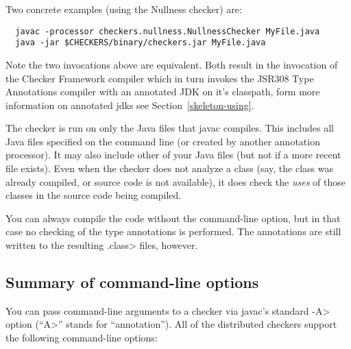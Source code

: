 Two concrete examples (using the Nullness checker) are:

\begin{smaller}
\begin{Verbatim}
  javac -processor checkers.nullness.NullnessChecker MyFile.java
  java -jar $CHECKERS/binary/checkers.jar MyFile.java
\end{Verbatim}
\end{smaller}

\noindent
Note the two invocations above are equivalent.  Both result in the invocation of the
Checker Framework compiler which in turn invokes the JSR308 Type Annotations compiler
with an annotated JDK on it's classpath, form more information on annotated jdks see
Section~\ref{skeleton-using}.

The checker is run on only the Java files that javac compiles.
This includes all Java files specified on the command line (or
created by another annotation processor).  It may also include other of
your Java files (but not if a more recent  file exists).
Even when the checker does not analyze a class (say, the class was
already compiled, or source code is not available), it does check
the \emph{uses} of those classes in the source code being compiled.

You can always compile the code without the 
command-line option, but in that case no checking of the type
annotations is performed.  The annotations are still written to the
resulting \<.class> files, however.



\subsection{Summary of command-line options\label{checker-options}}

You can pass command-line arguments to a checker via javac's standard \<-A>
option (``\<A>'' stands for ``annotation'').  All of the distributed
checkers support the following command-line options:

